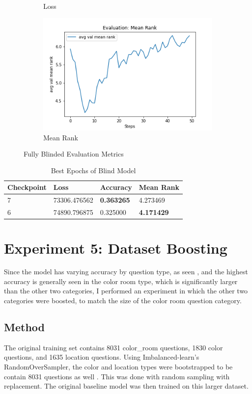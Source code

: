 \begin{figure}[h]
\begin{subfigure}[b]{0.3\textwidth}
         \caption{Loss}
         \label{fig:fb_e_loss}
     \end{subfigure}
     \hfill
     \begin{subfigure}[b]{0.3\textwidth}
         \centering
         \includegraphics[width=\textwidth]{./figure/results/fully_blinded/eval/avg val mean rank.png}
         \caption{Mean Rank}
         \label{fig:fb_e_mean_rank}
     \end{subfigure}
     \caption{Fully Blinded Evaluation Metrics}
     \label{fig:fb_e_metrics}
\end{figure}

\begin{table}[h]
\centering
\caption{Best Epochs of Blind Model}
\begin{tabular}{l | l | l | l}
Checkpoint & Loss & Accuracy & Mean Rank \\
\hline
7 & 73306.476562 & \textbf{0.363265} & 4.273469 \\
6 & 74890.796875 & 0.325000 & \textbf{4.171429}
\end{tabular}
\label{tab:best_blind}
\end{table}

\section{Experiment 5: Dataset Boosting}
\label{sec:exp_5}
Since the model has varying accuracy by question type, as seen , and the highest accuracy is generally seen in the color room type, which is significantly larger than the other two categories, I performed an experiment in which the other two categories were boosted, to match the size of the color room question category. 
\subsection{Method}
The original training set contains 8031 color\_room questions, 1830 color questions, and 1635 location questions. Using Imbalanced-learn's RandomOverSampler, the color and location types were bootstrapped to be contain 8031 questions as well \cite{imblearn}. This was done with random sampling with replacement. The original baseline model was then trained on this larger dataset.
